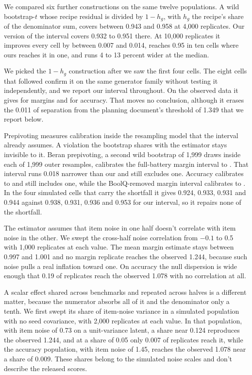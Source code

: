 We compared six further constructions on the same twelve populations. A wild bootstrap-$t$ whose recipe residual is divided by $1-h_g$, with $h_g$ the recipe's share of the denominator sum, covers between 0.943 and 0.958 at 4,000 replicates. Our version of the interval covers 0.932 to 0.951 there. At 10,000 replicates it improves every cell by between 0.007 and 0.014, reaches 0.95 in ten cells where ours reaches it in one, and runs 4 to 13 percent wider at the median.

We picked the $1-h_g$ construction after we saw the first four cells. The eight cells that followed confirm it on the same generator family without testing it independently, and we report our interval throughout. On the observed data it gives  for margins and  for accuracy. That moves no conclusion, although it erases the 0.011 of separation from the planning document's threshold of 1.349 that we report below.

Prepivoting measures calibration inside the resampling model that the interval already assumes. A violation the bootstrap shares with the estimator stays invisible to it. Beran prepivoting, a second wild bootstrap of 1,999 draws inside each of 1,999 outer resamples, calibrates the full-battery margin interval to . That interval runs 0.018 narrower than our  and still excludes one. Accuracy calibrates to  and still includes one, while the BoolQ-removed margin interval calibrates to . In the four simulated cells that carry the shortfall it gives 0.924, 0.933, 0.931 and 0.944 against 0.938, 0.931, 0.936 and 0.953 for our interval, so it repairs none of the shortfall.

The estimator assumes that item noise in one half doesn't correlate with item noise in the other. We swept the cross-half noise correlation from $-0.1$ to 0.5 with 1,000 replicates at each value. The mean margin estimate stays between 0.997 and 1.001 and no margin replicate reaches the observed 1.244, because such noise pulls a real inflation toward one. On accuracy the null dispersion is wide enough that 0.19 of replicates reach the observed 1.078 with no correlation at all.

A scalar effect shared across benchmarks and repeated across halves is a different matter, because the numerator absorbs all of it and the denominator only a tenth. We first swept its share of item-noise variance in a simulated population with no seed covariance, with 2,000 replicates at each value. In that population, with item noise of 0.73 on a unit-variance latent, a share near 0.124 reproduces the observed 1.244, and at a share of 0.05 only 0.007 of replicates reach it, while the accuracy population, with item noise of 1.45, reaches the observed 1.078 near a share of 0.009. These shares belong to the simulated noise scales and don't describe the released scores.

